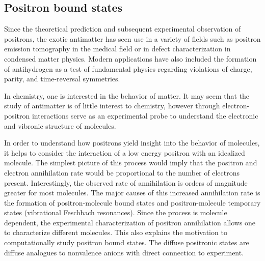 \subsection{Positron bound states}
Since the theoretical prediction\cite{10.1098/rspa.1928.0023} and subsequent experimental observation\cite{10.1126/science.76.1967.238} of positrons, the exotic antimatter has seen use in a variety of fields such as positron emission tomography in the medical field or in defect characterization in condensed matter physics.\cite{10.1088/0031-9155/51/13/R08,10.1146/annurev-bioeng-071114-040723,10.1146/annurev.ms.10.080180.002141,10.1016/j.matchar.2021.110952}
Modern applications have also included the formation of antihydrogen as a test of fundamental physics regarding violations of charge, parity, and time-reversal symmetries.\cite{10.1126/science.aaf6702,10.1038/nature24048,10.1103/PhysRevLett.110.140406,10.1038/nature14861,10.1103/PhysRevLett.82.3198}

In chemistry, one is interested in the behavior of matter.
It may seem that the study of antimatter is of little interest to chemistry, however through electron-positron interactions serve as an experimental probe to understand the electronic and vibronic structure of molecules.

In order to understand how positrons yield insight into the behavior of molecules, it helps to consider the interaction of a low energy positron with an idealized molecule.
The simplest picture of this process would imply that the positron and electron annihilation rate would be proportional to the number of electrons present.\cite{10.1103/RevModPhys.82.2557}
Interestingly, the observed rate of annihilation is orders of magnitude greater for most molecules.\cite{10.1103/RevModPhys.82.2557, 10.1103/PhysRev.140.A8, 10.1103/PhysRev.138.B216, 10.1088/0953-4075/39/17/L03, 10.1103/PhysRevLett.14.935, 10.1103/PhysRevA.77.060702, 10.1103/PhysRevLett.99.133201}
The major causes of this increased annihilation rate is the formation of positron-molecule bound states and positron-molecule temporary states (vibrational Feschbach resonances).\cite{10.1103/RevModPhys.82.2557, 10.1103/PhysRevLett.99.133201, 10.1103/PhysRevLett.88.043201,10.1103/PhysRevA.67.032706}
Since the process is molecule dependent, the experimental characterization of positron annihilation allows one to characterize different molecules.
This also explains the motivation to computationally study positron bound states.
The diffuse positronic states are diffuse analogues to nonvalence anions with direct connection to experiment.
